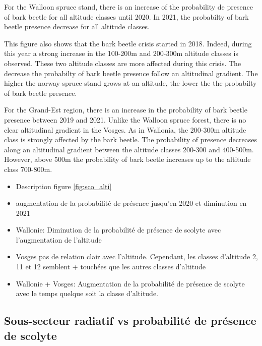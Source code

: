 \documentclass[3p,times]{elsarticle}
\begin{document}
For the Walloon spruce stand, there is an increase of the probability de presence of bark beetle for all altitude classes until 2020.
 In 2021, the probabilty of bark beetle presence decrease for all altitude classes.
  
This figure also shows that the bark beetle crisis started in 2018. Indeed, during this year a strong increase in the 100-200m and 200-300m altitude classes is observed. These two altitude classes are more affected during this crisis.  
The decrease the probabilty of bark beetle presence follow an altitudinal gradient. The higher the norway spruce stand grows at an altitude, the lower the the probabilty of bark beetle presence.


For the Grand-Est region, there is an increase in the probability of bark beetle presence between 2019 and 2021. Unlike the Walloon spruce forest, there is no clear altitudinal gradient in the Vosges.  
As in Wallonia, the 200-300m altitude class is strongly affected by the bark beetle. The probability of presence decreases along an altitudinal gradient between the altitude classes 200-300 and 400-500m. However, above 500m the probability of bark beetle increases up to the altitude class 700-800m.





\begin{itemize}
	\item Description figure \ref{fig:sco_alti} 
	\item augmentation de la probabilité de présence jusqu'en 2020 et diminution en 2021
	\item Wallonie: Diminution de la probabilité de présence de scolyte avec l'augmentation de l'altitude 
	\item Vosges pas de relation clair avec l'altitude. Cependant, les classes d'altitude 2, 11 et 12 semblent + touchées que les autres classes d'altitude
	
	\item Wallonie + Vosges: Augmentation de la probabilité de présence de scolyte avec le temps quelque soit la classe d'altitude.
\end{itemize}



\subsection{Sous-secteur radiatif vs probabilité de présence de scolyte}

\end{document}
